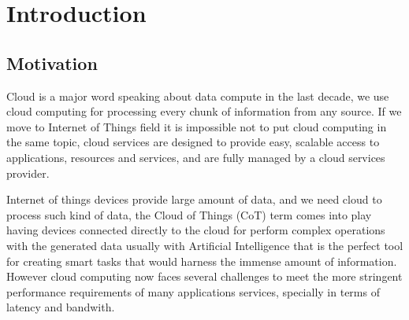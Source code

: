 
\cleardoublepage


\chapter{Introduction}
\label{makereference}



\section{Motivation}
\label{makereference1.1}

Cloud is a major word speaking about data compute in the last decade, we use cloud computing for processing every chunk of information from any source. 
If we move to Internet of Things field it is impossible not to put cloud computing in the same topic, cloud services are designed to provide easy, scalable access to applications, resources and services, and are fully managed by a cloud services provider.~\cite{cloud_def}  

Internet of things devices provide large amount of data, and we need cloud to process such kind of data, the Cloud of Things (CoT) term comes into play having devices connected directly to the cloud for perform complex operations with the generated data usually with Artificial Intelligence that is the perfect tool for creating smart tasks that would harness the immense amount of information.
However cloud computing now faces several challenges to meet the more stringent performance requirements of many applications services, specially in terms of latency and bandwith.~\cite{IEE:Morabito:2017}


